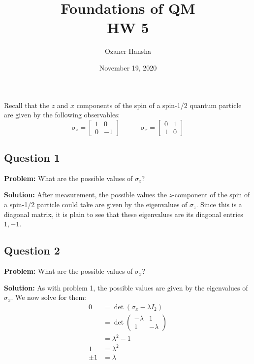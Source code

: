\documentclass{article}
\begin{document}
\title{Foundations of QM\\ HW 5}
\author{Ozaner Hansha}
\date{November 19, 2020}
\maketitle

Recall that the $z$ and $x$ components of the spin of a spin-1/2 quantum particle are given by the following observables:
$$
    \sigma_z=\begin{bmatrix}
        1&0\\0&-1
    \end{bmatrix}\qquad\quad
    \sigma_x=\begin{bmatrix}
        0&1\\1&0
    \end{bmatrix}
$$

\subsection*{Question 1}
\noindent\textbf{Problem:} What are the possible values of $\sigma_z$?
\bigskip

\noindent\textbf{Solution:} After measurement, the possible values the $z$-component of the spin of a spin-1/2 particle could take are given by the eigenvalues of $\sigma_z$. Since this is a diagonal matrix, it is plain to see that these eigenvalues are its diagonal entries $1, -1$.

\subsection*{Question 2}
\noindent\textbf{Problem:} What are the possible values of $\sigma_x$?
\bigskip

\noindent\textbf{Solution:} As with problem 1, the possible values are given by the eigenvalues of $\sigma_x$. We now solve for them:
\begin{align*}
    0&=\det(\sigma_x-\lambda I_2)\tag{characteristic equation}\\
    &=\det\begin{pmatrix}
        -\lambda&1\\1&-\lambda
    \end{pmatrix}\\
    &=\lambda^2-1\tag{det. of $2\times2$ matrix}\\
    1&=\lambda^2\\
    \pm1&=\lambda
\end{align*}
\end{document}
